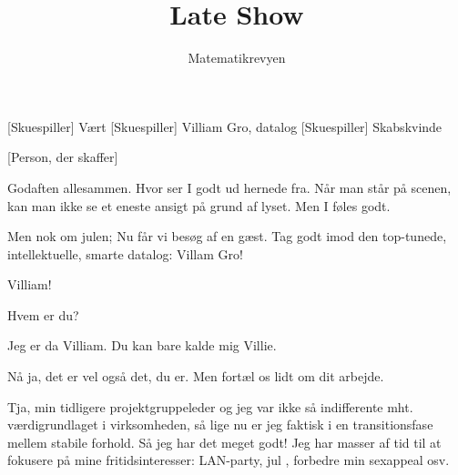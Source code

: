 \documentclass[a4paper,11pt]{article}
\title{Late Show}
\author{Matematikrevyen}
\begin{document}
\maketitle

\begin{roles}
[Skuespiller] Vært
[Skuespiller] Villiam Gro, datalog
[Skuespiller] Skabskvinde
\end{roles}

\begin{props}
[Person, der skaffer]
\end{props}

\begin{sketch}



 Godaften allesammen. Hvor ser I godt ud hernede fra. Når man står på scenen, kan man ikke se et eneste ansigt på grund af lyset. Men I føles godt.

 Men nok om julen; Nu får vi besøg af en gæst. Tag godt imod den top-tunede, intellektuelle, smarte datalog: Villam Gro!


  Villiam!


 Hvem er du?

 Jeg er da Villiam.  Du kan bare kalde mig Villie.

 Nå ja, det er vel også det, du er. Men fortæl os lidt om dit arbejde.

 Tja, min tidligere projektgruppeleder og jeg var ikke så indifferente mht. værdigrundlaget i virksomheden, så lige nu er jeg faktisk i en transitionsfase mellem stabile forhold. Så jeg har det meget godt! Jeg har masser af tid til at fokusere på mine fritidsinteresser: LAN-party, jul , forbedre min sexappeal osv.


\end{sketch}
\end{document}
